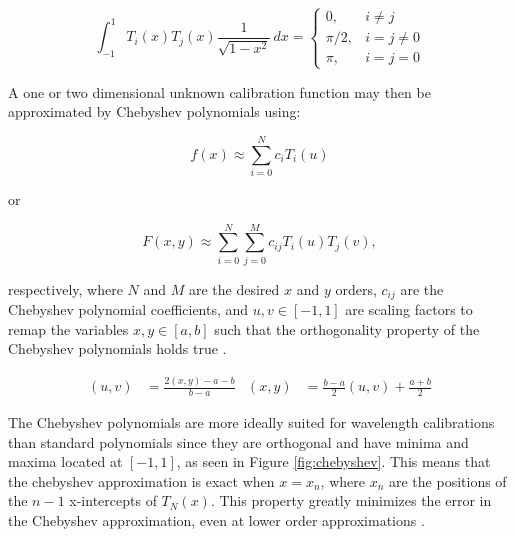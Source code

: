 \begin{equation}
    \int_{-1}^{1} T_{i}(x) T_{j}(x) \frac{1}{\sqrt{1-x^{2}}} \,dx =
    \begin{cases}
        0,       & i \neq j\\
        \pi / 2, & i = j \neq 0\\
        \pi,     & i = j = 0
    \end{cases}
    \label{eq:chebyorth}
\end{equation}

A one or two dimensional unknown calibration function may then be approximated by Chebyshev polynomials using:

\begin{equation}
    f(x) \approx \sum_{i = 0}^{N}  c_{i} T_{i}(u)
    \label{eq:chebyshev}
\end{equation}

\noindent or

\begin{equation}
    F(x, y) \approx \sum_{i = 0}^{N} \sum_{j = 0}^{M} c_{ij} T_{i}(u) T_{j}(v),
    \label{eq:chebyshev2D}
\end{equation}

\noindent respectively, where $N$ and $M$ are the desired $x$ and $y$ orders, $c_{ij}$ are the Chebyshev polynomial coefficients, and $u, v \in [-1, 1]$ are scaling factors to remap the variables $x, y \in [a, b]$ such that the orthogonality property of the Chebyshev polynomials holds true \citep{chebysurf, cheby2d}.

\begin{align}
    (u, v) &= \frac{2 (x, y) - a - b}{b - a} & (x, y) &= \frac{b - a}{2} (u, v) + \frac{a+b}{2}
    \label{eq:XtoUV}
\end{align}





The Chebyshev polynomials are more ideally suited for wavelength calibrations than standard polynomials since they are orthogonal and have minima and maxima located at $[-1, 1]$, as seen in Figure \ref{fig:chebyshev}. This means that the chebyshev approximation is exact when $x = x_{n}$, where $x_{n}$ are the positions of the $n - 1$ x-intercepts of $T_{N}(x)$. This property greatly minimizes the error in the Chebyshev approximation, even at lower order approximations \citep{cheby}.

